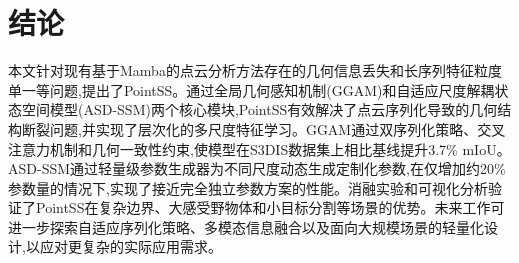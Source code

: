 \documentclass[preprint,12pt]{elsarticle}
\begin{document}
\section{结论}
本文针对现有基于Mamba的点云分析方法存在的几何信息丢失和长序列特征粒度单一等问题,提出了PointSS。通过全局几何感知机制(GGAM)和自适应尺度解耦状态空间模型(ASD-SSM)两个核心模块,PointSS有效解决了点云序列化导致的几何结构断裂问题,并实现了层次化的多尺度特征学习。GGAM通过双序列化策略、交叉注意力机制和几何一致性约束,使模型在S3DIS数据集上相比基线提升3.7\% mIoU。ASD-SSM通过轻量级参数生成器为不同尺度动态生成定制化参数,在仅增加约20\%参数量的情况下,实现了接近完全独立参数方案的性能。消融实验和可视化分析验证了PointSS在复杂边界、大感受野物体和小目标分割等场景的优势。未来工作可进一步探索自适应序列化策略、多模态信息融合以及面向大规模场景的轻量化设计,以应对更复杂的实际应用需求。









\end{document}
